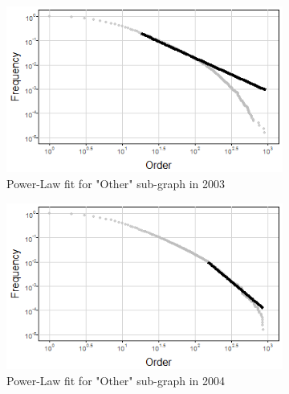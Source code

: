 \begin{figure}
\centering
\begin{subfigure}{.5\textwidth}
  \centering
  \includegraphics[width=0.9\linewidth]{Figures/plFit2003}
 \caption[]{\small Power-Law fit for "Other" sub-graph in 2003}
\label{fig:plFit2003}
\end{subfigure}%
\begin{subfigure}{.5\textwidth}
  \centering
  \includegraphics[width=0.9\linewidth]{Figures/plFit2004}
  \caption[]{\small Power-Law fit for "Other" sub-graph in 2004}
\label{fig:plFit2004}
\end{subfigure}
\caption[Power-law fitting to different parts of the curve for the "Other" sub-graph]{}
\label{fig:plFits}
\end{figure}

